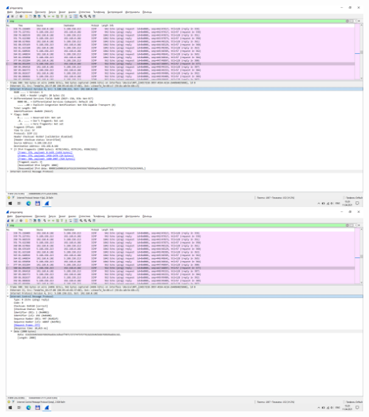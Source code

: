 \includegraphics{screenshots/ping_2000_response_2}
\includegraphics{screenshots/ping_2000_response_3}
